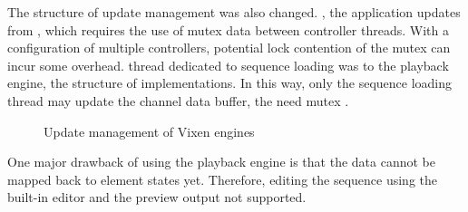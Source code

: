The structure of update management was also changed. , the application updates  from , which requires the use of mutex  data  between controller threads. With a configuration  of multiple controllers, potential lock contention of the mutex can incur some overhead.  thread dedicated to sequence loading was  to the playback engine,  the structure of  implementations. In this way, only the sequence loading thread may update the channel data buffer,  the need  mutex . 

\begin{figure}[t]
  \centering
  \hfil
  \caption{\footnotesize Update management of Vixen engines}
  \label{fig:update}
\end{figure}

One major drawback of using the playback engine is that the  data cannot be mapped back to element states yet. Therefore, editing the  sequence using the built-in editor and the preview output  not supported.


